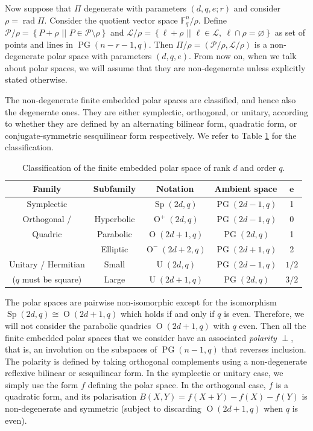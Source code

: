 \documentclass[a4paper]{article}
\theoremstyle{definition}
\newcommand{\FF}{\mathbb F}
\DeclareMathOperator{\rad}{rad}
\newcommand{\sett}[2]{ \left\{ #1 \, \, || \, \, #2 \right \} }
\newcommand{\ml}{\mathcal L}
\renewcommand{\mp}{\mathcal P}
\DeclareMathOperator{\PG}{PG}
\newcommand{\pg}{\PG}
\DeclareMathOperator{\Sp}{Sp}
\DeclareMathOperator{\OO}{O}
\DeclareMathOperator{\U}{U}
\begin{document}
Now suppose that $\Pi$ degenerate with parameters $(d,q,e;r)$ and consider $\rho = \rad \Pi$.
Consider the quotient vector space $\FF_q^n / \rho$.
Define $\mp / \rho = \sett{ P + \rho }{P \in \mp \setminus \rho}$ and $\ml / \rho = \sett{\ell + \rho}{\ell \in \ml,\ \ell \cap \rho = \varnothing}$ as set of points and lines in $\pg(n-r-1,q)$.
Then $\Pi/\rho = (\mp/\rho, \ml/\rho)$ is a non-degenerate polar space with parameters $(d,q,e)$.
From now on, when we talk about polar spaces, we will assume that they are non-degenerate unless explicitly stated otherwise.


The non-degenerate finite embedded polar spaces are classified, and hence also the degenerate ones.
They are either symplectic, orthogonal, or unitary, according to whether they are defined by an alternating bilinear form, quadratic form, or conjugate-symmetric sesquilinear form respectively.
We refer to Table \ref{Tab:Pol} for the classification.

\begin{table}[h!]
 \centering
 \begin{tabular}{ c | c | c | c | c }
  {\bf Family} & {\bf Subfamily} & {\bf Notation} & {\bf Ambient space} & $\boldsymbol e$ \\ \hline \hline
  Symplectic & & $\Sp(2d,q)$ & $\pg(2d-1,q)$ & 1 \\ \hline
  Orthogonal / & Hyperbolic & $\OO^+(2d,q)$ & $\pg(2d-1,q)$ & 0 \\
  Quadric & Parabolic & $\OO(2d+1,q)$ & $\pg(2d,q)$ & 1 \\
  & Elliptic & $\OO^-(2d+2,q)$ & $\pg(2d+1,q)$ & 2 \\ \hline 
  Unitary / Hermitian & Small & $\U(2d,q)$ & $\pg(2d-1,q)$ & $1/2$ \\
  ($q$ must be square) & Large & $\U(2d+1,q)$ & $\pg(2d,q)$ & $3/2$
 \end{tabular}
 \caption{Classification of the finite embedded polar space of rank $d$ and order $q$.}
 \label{Tab:Pol}
\end{table}
The polar spaces are pairwise non-isomorphic except for the isomorphism $\Sp(2d,q) \cong \OO(2d+1,q)$ which holds if and only if $q$ is even.
Therefore, we will not consider the parabolic quadrics $\OO(2d+1,q)$ with $q$ even.
Then all the finite embedded polar spaces that we consider have an associated \emph{polarity} $\perp$, that is, an involution on the subspaces of $\pg(n-1,q)$ that reverses inclusion.
The polarity is defined by taking orthogonal complements using a non-degenerate reflexive bilinear or sesquilinear form.
In the symplectic or unitary case, we simply use the form $f$ defining the polar space.
In the orthogonal case, $f$ is a quadratic form, and its polarisation $B(X,Y) = f(X+Y) - f(X) - f(Y)$ is non-degenerate and symmetric (subject to discarding $\OO(2d+1,q)$ when $q$ is even).
\end{document}
